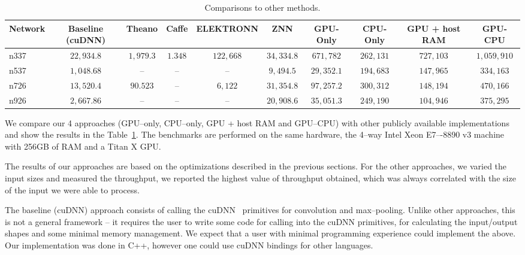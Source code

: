 \documentclass[conference]{./IEEEtran/IEEEtran}
\begin{document}
  \begin{table}[h!tbp]
    { \footnotesize
    \centering
    \begin{tabular}{l|ccccccccc}
      \toprule
      Network  & Baseline (cuDNN)  & Theano      & Caffe    & ELEKTRONN   & ZNN         & GPU-Only    & CPU-Only    & GPU + host RAM & GPU-CPU   \\
      \midrule
      n337     & $22,934.8$        & $1,979.3$   & $1.348$  & $122,668$   & $34,334.8$  & $671,782$   & $262,131$   & $727,103$      & $1,059,910$ \\
      n537     & $1,048.68$        & --          & --       & --          & $9,494.5$   & $29,352.1$  & $194,683$   & $147,965$      & $334,163$ \\
      n726     & $13,520.4$        & $90.523$    & --       & $6,122$     & $31,354.8$  & $97,257.2$  & $300,312$   & $148,194$      & $470,166$ \\
      n926     & $2,667.86$        & --          & --       & --          & $20,908.6$  & $35,051.3$  & $249,190$   & $104,946$      & $375,295$ \\
      \bottomrule
    \end{tabular}
    \caption{Comparisons to other methods.}
    \label{table:comparisons_to_others}
  }
  \end{table}

  We compare our 4 approaches (GPU--only, CPU--only, GPU + host RAM
  and GPU--CPU) with other publicly available implementations and show
  the results in the Table~\ref{table:comparisons_to_others}.  The
  benchmarks are performed on the same hardware, the 4--way Intel Xeon
  E7–-8890 v3 machine with 256GB of RAM and a Titan X GPU.

  The results of our approaches are based on the optimizations
  described in the previous sections.  For the other approaches, we
  varied the input sizes and measured the throughput, we reported the
  highest value of throughput obtained, which was always correlated
  with the size of the input we were able to process.

  The baseline (cuDNN) approach consists of calling the
  cuDNN~\cite{chetlur2014cudnn} primitives for convolution and
  max--pooling.  Unlike other approaches, this is not a general framework
  -- it requires the user to write some code for calling into the
  cuDNN primitives, for calculating the input/output shapes and some
  minimal memory management.  We expect that a user with minimal
  programming experience could implement the above.  Our
  implementation was done in C++, however one could use cuDNN bindings
  for other languages.
\end{document}
